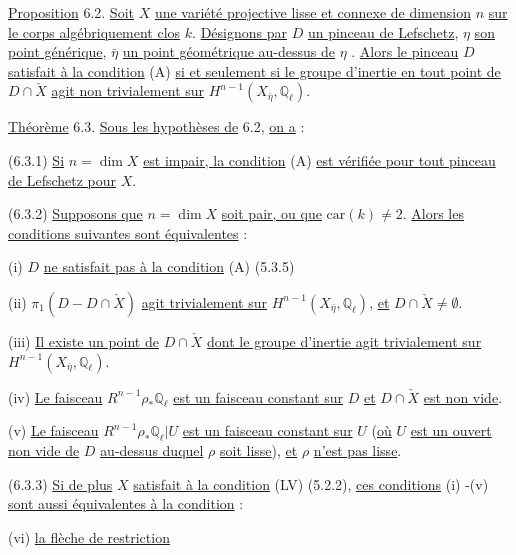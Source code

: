 
\underline{Proposition} 6.2. \underline{Soit} $X$ \underline{une variété projective lisse et connexe de dimension} $n$ \underline{sur le corps algébriquement clos} $k$. \underline{Désignons par} $D$ \underline{un pinceau de Lefschetz}, $\eta$ \underline{son point générique}, $\bar{\eta}$ \underline{un point géométrique au-dessus de} $\eta$ . \underline{Alors le pinceau} $D$ \underline{satisfait à la condition} (A) \underline{si et seulement si le groupe d'inertie en tout point de} $D \cap \check{X}$ \underline{agit non trivialement sur} $H^{n-1}(X_{\bar{\eta}},\mathbb{Q}_\ell)$.

\underline{Théorème} 6.3. \underline{Sous les hypothèses de} 6.2, \underline{on a} :

(6.3.1) \underline{Si} $n = \dim X$ \underline{est impair, la condition} (A) \underline{est vérifiée pour tout pinceau de Lefschetz pour} $X$.

(6.3.2) \underline{Supposons que} $n = \dim X$ \underline{soit pair, ou que} $\mathrm{car}(k) \neq 2$. \underline{Alors les conditions suivantes sont équivalentes} :

(i) $D$ \underline{ne satisfait pas à la condition} (A) (5.3.5)

(ii) $\pi_1(D-D \cap \check{X})$ \underline{agit trivialement sur} $H^{n-1}(X_{\bar{\eta}},\mathbb{Q}_\ell)$, \underline{et} $D \cap \check{X} \neq \emptyset$.

(iii) \underline{Il existe un point de} $D \cap \check{X}$ \underline{dont le groupe d'inertie agit trivialement sur} $H^{n-1}(X_{\bar{\eta}},\mathbb{Q}_\ell)$.

(iv) \underline{Le faisceau} $R^{n-1}\rho_*\mathbb{Q}_\ell$ \underline{est un faisceau constant sur} $D$ \underline{et} $D \cap \check{X}$ \underline{est non vide}.

(v) \underline{Le faisceau} $R^{n-1}\rho_*\mathbb{Q}_\ell|U$ \underline{est un faisceau constant sur} $U$ (\underline{où} $U$ \underline{est un ouvert non vide de} $D$ \underline{au-dessus duquel} $\rho$ \underline{soit lisse}), \underline{et} $\rho$ \underline{n'est pas lisse}.



(6.3.3)  \underline{Si de plus} $X$ \underline{satisfait à la condition} (LV) (5.2.2), \underline{ces conditions} (i) -(v) \underline{sont aussi équivalentes à la condition} :

(vi)  \underline{la flèche de restriction}

